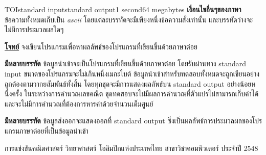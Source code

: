 \documentclass[11pt,a4paper]{article}
\begin{document}
\begin{problem}{TOI}{standard input}{standard output}{1 second}{64 megabytes}
\textbf{เงื่อนไขอื่นๆของภาษา} ข้อความทั้งหมดเก็บเป็น \textit{ascii} โดยแต่ละบรรทัดจะมีเพียงหนึ่งข้อความสั่งเท่านั้น และบรรทัดว่างจะไม่มีการประมวลผลใดๆ

\bigskip
\underline{\textbf{โจทย์}}  จงเขียนโปรแกรมเพื่อหาผลลัพธ์ของโปรแกรมที่เขียนขึ้นด้วยภาษาต๋อย


\InputFile

\textbf{มีหลายบรรทัด} ข้อมูลนำเข้าจะเป็นโปรแกรมที่เขียนขึ้นด้วยภาษาต๋อย โดยรับผ่านทาง standard input ขนาดของโปรแกรมจะไม่เกินหนึ่งเมกะไบต์ ข้อมูลนำเข้าสำหรับทดสอบทั้งหมดจะถูกเขียนอย่างถูกต้องตามวากยสัมพันธ์ทั้งสิ้น โดยทุกชุดจะมีการแสดงผลลัพธ์บน standard output อย่างน้อยหนึ่งครั้ง ในระหว่างการคำนวณเลขคณิต ชุดทดสอบจะไม่มีผลการคำนวณที่ตัวแปรไม่สามารถเก็บค่าได้ และจะไม่มีการคำนวณที่ต้องการหารค่าด้วยจำนวนเต็มศูนย์


\OutputFile

\textbf{มีหลายบรรทัด} ข้อมูลส่งออกจะแสดงออกที่ standard output ซึ่งเป็นผลลัพธ์การประมวลผลของโปรแกรมภาษาต๋อยที่เป็นข้อมูลนำเข้า

\Examples

\begin{example}
%
\end{example}


\Source

การแข่งขันคณิตศาสตร์ วิทยาศาสตร์ โอลิมปิกแห่งประเทศไทย สาขาวิชาคอมพิวเตอร์ ประจำปี 2548

\end{problem}
\end{document}
